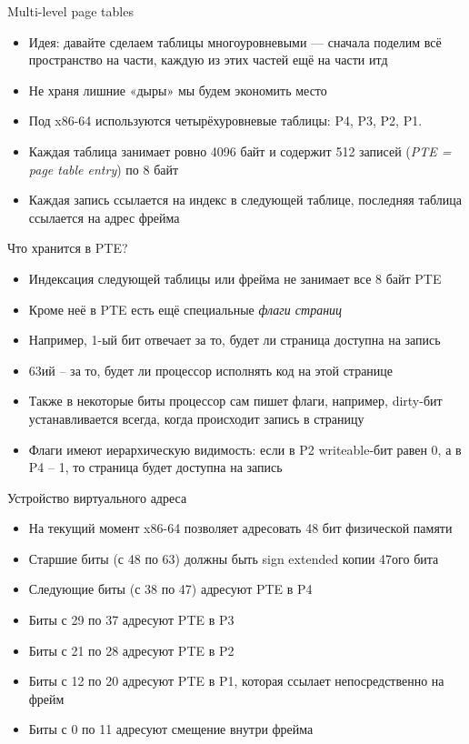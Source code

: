 \documentclass[10pt,pdf,hyperref={unicode}]{beamer}
\begin{document}
\begin{frame}{Multi-level page tables}
\begin{itemize}
    \item Идея: давайте сделаем таблицы многоуровневыми — сначала поделим всё пространство на части, каждую из этих частей ещё на части итд
    \item Не храня лишние «дыры» мы будем экономить место
     \item Под x86-64 используются четырёхуровневые таблицы: P4, P3, P2, P1.
     \item Каждая таблица занимает ровно 4096 байт и содержит 512 записей (\emph{PTE = page table entry}) по 8 байт
     \item Каждая запись ссылается на индекс в следующей таблице, последняя таблица ссылается на адрес фрейма
\end{itemize}
\end{frame}

\begin{frame}{Что хранится в PTE?}
\begin{itemize}
    \item Индексация следующей таблицы или фрейма не занимает все 8 байт PTE
    \item Кроме неё в PTE есть ещё специальные \emph{флаги страниц}
    \item Например, 1-ый бит отвечает за то, будет ли страница доступна на запись
    \item 63ий -- за то, будет ли процессор исполнять код на этой странице
    \item Также в некоторые биты процессор сам пишет флаги, например, dirty-бит устанавливается всегда, когда происходит запись в страницу
    \item Флаги имеют иерархическую видимость: если в P2 writeable-бит равен 0, а в P4 -- 1, то страница будет доступна на запись
\end{itemize}
\end{frame}

\begin{frame}{Устройство виртуального адреса}
\begin{itemize}
    \item На текущий момент x86-64 позволяет адресовать 48 бит физической памяти
    \item Старшие биты (с 48 по 63) должны быть sign extended копии 47ого бита
    \item Следующие биты (с 38 по 47) адресуют PTE в P4
    \item Биты с 29 по 37 адресуют PTE в P3
    \item Биты с 21 по 28 адресуют PTE в P2
    \item Биты с 12 по 20 адресуют PTE в P1, которая ссылает непосредственно на фрейм
    \item Биты с 0 по 11 адресуют смещение внутри фрейма
\end{itemize}
\end{frame}
\end{document}
